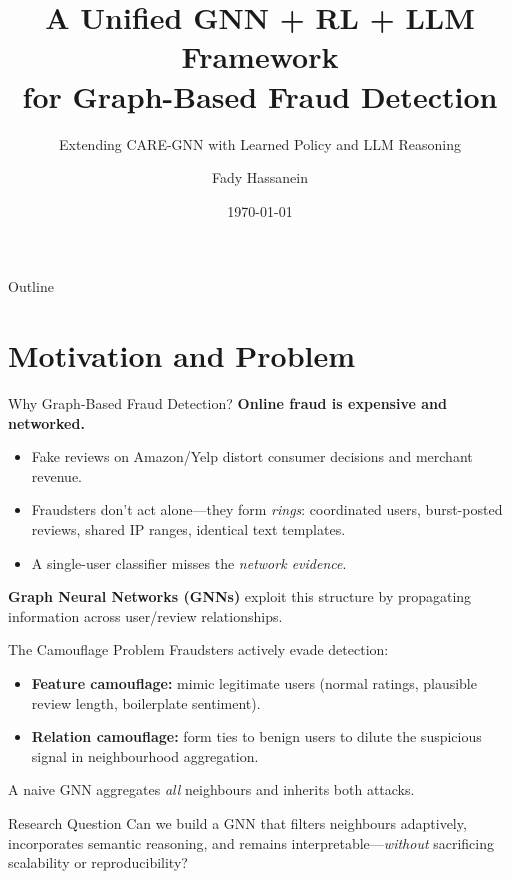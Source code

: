 \documentclass[aspectratio=169,10pt]{beamer}
\title{A Unified GNN + RL + LLM Framework \\ for Graph-Based Fraud Detection}
\subtitle{Extending CARE-GNN with Learned Policy and LLM Reasoning}
\author{Fady Hassanein}
\institute{Master's Thesis}
\date{\today}
\begin{document}
\begin{frame}
    \titlepage
\end{frame}

\begin{frame}{Outline}
    \tableofcontents
\end{frame}

\section{Motivation and Problem}

\begin{frame}{Why Graph-Based Fraud Detection?}
    \textbf{Online fraud is expensive and networked.}
    \begin{itemize}
        \item Fake reviews on Amazon/Yelp distort consumer decisions and merchant revenue.
        \item Fraudsters don't act alone---they form \emph{rings}: coordinated users,
              burst-posted reviews, shared IP ranges, identical text templates.
        \item A single-user classifier misses the \emph{network evidence}.
    \end{itemize}
    \vspace{0.5em}
    \textbf{Graph Neural Networks (GNNs)} exploit this structure by propagating
    information across user/review relationships.
\end{frame}

\begin{frame}{The Camouflage Problem}
    Fraudsters actively evade detection:
    \begin{itemize}
        \item[\textcolor{negative}{$\bullet$}]\textbf{Feature camouflage:} mimic legitimate users
              (normal ratings, plausible review length, boilerplate sentiment).
        \item[\textcolor{negative}{$\bullet$}]\textbf{Relation camouflage:} form ties to benign users
              to dilute the suspicious signal in neighbourhood aggregation.
    \end{itemize}
    \vspace{0.5em}
    A naive GNN aggregates \emph{all} neighbours and inherits both attacks.
    \vspace{0.5em}
    \begin{alertblock}{Research Question}
        Can we build a GNN that filters neighbours adaptively, incorporates
        semantic reasoning, and remains interpretable---\emph{without} sacrificing
        scalability or reproducibility?
    \end{alertblock}
\end{frame}
\end{document}
